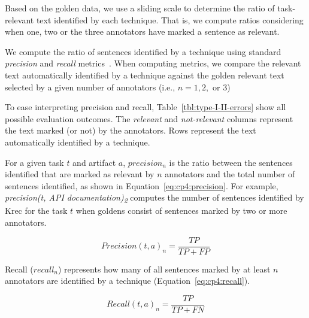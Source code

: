 Based on the golden data, we use a sliding scale to determine the ratio of task-relevant text identified by each technique. That is, we compute ratios considering when one, two or the three annotators have marked a sentence as relevant.


We  
compute the ratio of sentences identified by a technique using standard \textit{precision} and \textit{recall} metrics~\cite{Manning2009IR}. When computing metrics, we compare the relevant text automatically identified by a technique against the golden relevant text 
selected by a given number of annotators (i.e., $n=1, 2,$ or $3$)



To ease interpreting precision and recall, Table~\ref{tbl:type-I-II-errors} show all possible evaluation outcomes. The \textit{relevant} and \textit{not-relevant} columns represent the text 
marked (or not) by the annotators. Rows represent the text automatically identified by a technique.




 






For a given task $t$ and artifact $a$, $precision_n$ is the ratio between the sentences identified that are marked as relevant by $n$ annotators and the total number of sentences identified, as shown in Equation~\ref{eq:cp4:precision}. For example,  \textit{precision(t, API documentation)\textsubscript{2}} computes the number of sentences identified by \acs{Krec} for the task $t$ when 
goldens consist of sentences marked by two or more annotators.


\begin{equation}
\label{eq:cp4:precision}    
    Precision(t, a)_n = \frac{TP}{TP + FP}
\end{equation}


Recall ($recall_n$) represents how many of all sentences marked by at least $n$ annotators are identified by a technique (Equation~\ref{eq:cp4:recall}).



\begin{equation}
\label{eq:cp4:recall}        
    Recall(t, a)_n = \frac{TP}{TP + FN}
\end{equation}

\vspace{3mm}




